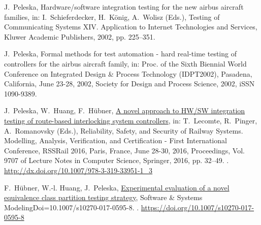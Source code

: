 \documentclass[3p,times]{elsarticle}
\begin{document}
\begin{thebibliography}{10}
J.~Peleska, Hardware/software integration testing for the new airbus aircraft
  families, in: I.~Schieferdecker, H.~K{\"o}nig, A.~Wolisz (Eds.), {Testing of
  Communicating Systems XIV. Application to Internet Technologies and
  Services}, Kluwer Academic Publishers, 2002, pp. 225--351.

J.~Peleska, Formal methods for test automation - hard real-time testing of
  controllers for the airbus aircraft family, in: Proc. of the Sixth Biennial
  World Conference on Integrated Design \& Process Technology (IDPT2002),
  Pasadena, California, June 23-28, 2002, Society for Design and Process
  Science, 2002, iSSN 1090-9389.
  
J.~Peleska, W.~Huang, F.~H{\"{u}}bner,
  \href{http://dx.doi.org/10.1007/978-3-319-33951-1_3}{A novel approach to
  {HW/SW} integration testing of route-based interlocking system controllers},
  in: T.~Lecomte, R.~Pinger, A.~Romanovsky (Eds.), Reliability, Safety, and
  Security of Railway Systems. Modelling, Analysis, Verification, and
  Certification - First International Conference, RSSRail 2016, Paris, France,
  June 28-30, 2016, Proceedings, Vol. 9707 of Lecture Notes in Computer
  Science, Springer, 2016, pp. 32--49.
\newblock \href {http://dx.doi.org/10.1007/978-3-319-33951-1_3}
  {}.
\newline\urlprefix\url{http://dx.doi.org/10.1007/978-3-319-33951-1_3}

F.~H{\"u}bner, W.-l. Huang, J.~Peleska,
  \href{https://doi.org/10.1007/s10270-017-0595-8}{Experimental evaluation of a
  novel equivalence class partition testing strategy}, Software {\&} Systems
  ModelingDoi=10.1007/s10270-017-0595-8.
\newblock \href {http://dx.doi.org/10.1007/s10270-017-0595-8}
  {}.
\newline\urlprefix\url{https://doi.org/10.1007/s10270-017-0595-8}  


\end{thebibliography}

\end{document}

